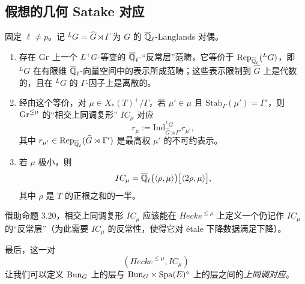 \subsection{假想的几何 Satake 对应}%

固定 $\ell\neq p$。记 ${}^LG=\widehat{G}\rtimes\Gamma$ 为 $G$ 的 $\overline{\mathbb{Q}}_\ell$-Langlands 对偶。

\begin{conjecture}\label{conj:3.21}
\begin{enumerate}[label=(\arabic*)]
  \item 存在 $\mathrm{Gr}$ 上一个 $L^+G$-等变的 $\overline{\mathbb{Q}}_\ell$-“反常层”范畴，它等价于 $\mathrm{Rep}_{\overline{\mathbb{Q}}_\ell}({}^LG)$，即 ${}^LG$ 在有限维 $\overline{\mathbb{Q}}_\ell$-向量空间中的表示所成范畴；这些表示限制到 $\widehat{G}$ 上是代数的，且在 ${}^LG$ 的 $\Gamma$-因子上是离散的。
  \item 经由这个等价，对 $\mu\in X_*(T)^+/\Gamma$，若 $\mu'\in\mu$ 且 $\mathrm{Stab}_\Gamma(\mu')=\Gamma'$，则 $\mathrm{Gr}^{\le\mu}$ 的“相交上同调复形” $IC_\mu$ 对应
  \[
    r_\mu:=\mathrm{Ind}_{\widehat{G}\rtimes\Gamma'}^{{}^LG}r_{\mu'},
  \]
  其中 $r_{\mu'}\in\mathrm{Rep}_{\overline{\mathbb{Q}}_\ell}(\widehat{G}\rtimes\Gamma')$ 是最高权 $\mu'$ 的不可约表示。
  \item 若 $\mu$ 极小，则
  \[
    IC_\mu=\overline{\mathbb{Q}}_\ell\bigl(\langle\rho,\mu\rangle\bigr)\bigl[\langle 2\rho,\mu\rangle\bigr],
  \]
  其中 $\rho$ 是 $T$ 的正根之和的一半。
\end{enumerate}
\end{conjecture}

借助命题 3.20，相交上同调复形 $IC_\mu$ 应该能在 $\mathit{Hecke}^{\le\mu}$ 上定义一个仍记作 $IC_\mu$ 的“反常层”（为此需要 $IC_\mu$ 的反常性，使得它对 étale 下降数据满足下降）。

最后，这一对
\[
  (\mathit{Hecke}^{\le\mu},IC_\mu)
\]
让我们可以定义 $\mathrm{Bun}_G$ 上的层与 $\mathrm{Bun}_G\times\mathrm{Spa}(E)^{\diamond}$ 上的层之间的\emph{上同调对应}。
